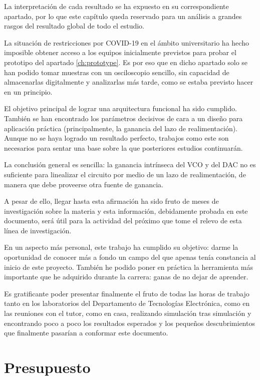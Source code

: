 \documentclass[12pt]{report} %
\begin{document}
	La interpretación de cada resultado se ha expuesto en su correspondiente apartado, por lo que este capítulo queda reservado para un análisis a grandes rasgos del resultado global de todo el estudio.
	
	La situación de restricciones por COVID-19 en el ámbito universitario ha hecho imposible obtener acceso a los equipos inicialmente previstos para probar el prototipo del apartado \ref{ch:prototype}. Es por eso que en dicho apartado solo se han podido tomar muestras con un osciloscopio sencillo, sin capacidad de almacenarlas digitalmente y analizarlas más tarde, como se estaba previsto hacer en un principio.
	
	El objetivo principal de lograr una arquitectura funcional ha sido cumplido. También se han encontrado los parámetros decisivos de cara a un diseño para aplicación práctica (principalmente, la ganancia del lazo de realimentación). Aunque no se haya logrado un resultado perfecto, trabajos como este son necesarios para sentar una base sobre la que posteriores estudios continuarán. 
	
	La conclusión general es sencilla: la ganancia intrínseca del VCO y del DAC no es suficiente para linealizar el circuito por medio de un lazo de realimentación, de manera que debe proveerse otra fuente de ganancia. 
	
	A pesar de ello, llegar hasta esta afirmación ha sido fruto de meses de investigación sobre la materia y esta información, debidamente probada en este documento, será útil para la actividad del próximo que tome el relevo de esta línea de investigación.
	
	En un aspecto más personal, este trabajo ha cumplido su objetivo: darme la oportunidad de conocer más a fondo un campo del que apenas tenía constancia al inicio de este proyecto. También he podido poner en práctica la herramienta más importante que he adquirido durante la carrera: ganas de no dejar de aprender. 
	
	Es gratificante poder presentar finalmente el fruto de todas las horas de trabajo tanto en los laboratorios del Departamento de Tecnologías Electrónica, como en las reuniones con el tutor, como en casa, realizando simulación tras simulación y encontrando poco a poco los resultados esperados y los pequeños descubrimientos que finalmente pasarían a conformar este documento.
	

\chapter{Presupuesto}
\end{document}
